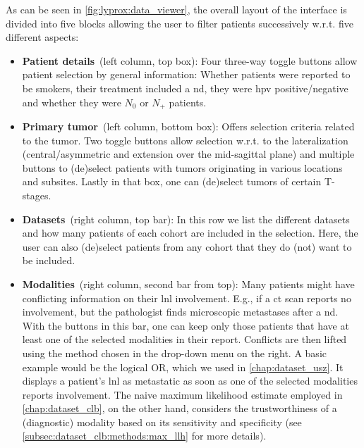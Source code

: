 \documentclass[\relativeRoot/main.tex]{subfiles}
\begin{document}
As can be seen in \cref{fig:lyprox:data_viewer}, the overall layout  of the interface is divided into five blocks allowing the user to filter patients successively w.r.t. five different aspects:

\begin{itemize}
    \item \textbf{Patient details}~(left column, top box): Four three-way toggle buttons allow patient selection by general information: Whether patients were reported to be smokers, their treatment included a \acrlong{nd}, they were \gls{hpv} positive/negative and whether they were $N_0$ or $N_+$ patients.
    \item \textbf{Primary tumor}~(left column, bottom box): Offers selection criteria related to the tumor. Two toggle buttons allow selection w.r.t. to the lateralization (central/asymmetric and extension over the mid-sagittal plane) and multiple buttons to (de)select patients with tumors originating in various locations and subsites. Lastly in that box, one can (de)select tumors of certain T-stages.
    \item \textbf{Datasets}~(right column, top bar): In this row we list the different datasets and how many patients of each cohort are included in the selection. Here, the user can also (de)select patients from any cohort that they do (not) want to be included.
    \item \textbf{Modalities}~(right column, second bar from top): Many patients might have conflicting information on their \gls{lnl} involvement. E.g., if a \gls{ct} scan reports no involvement, but the pathologist finds microscopic metastases after a \gls{nd}. With the buttons in this bar, one can keep only those patients that have at least one of the selected modalities in their report. Conflicts are then lifted using the method chosen in the drop-down menu on the right. A basic example would be the logical OR, which we used in \cref{chap:dataset_usz}. It displays a patient's \gls{lnl} as metastatic as soon as one of the selected modalities reports involvement. The naive maximum likelihood estimate employed in \cref{chap:dataset_clb}, on the other hand, considers the trustworthiness of a (diagnostic) modality based on its sensitivity and specificity (see \cref{subsec:dataset_clb:methods:max_llh} for more details).

\end{itemize}
\end{document}
